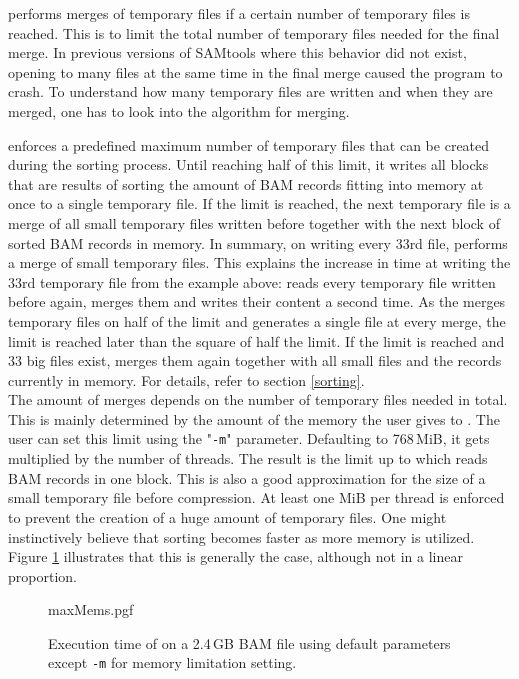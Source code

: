 \sort performs merges of temporary files if a certain number of temporary files is reached. This is to limit the total number of temporary files needed for the final merge. In previous versions of SAMtools where this behavior did not exist, opening to many files at the same time in the final merge caused the program to crash.
To understand how many temporary files are written and when they are merged, one has to look into the algorithm for merging. 

 \sort enforces a predefined maximum number of temporary files that can be created during the sorting process. Until reaching half of this limit, it writes all blocks that are results of sorting the amount of BAM records fitting into memory at once to a single temporary file. If the limit is reached, the next temporary file is a merge of all small temporary files written before together with the next block of sorted BAM records in memory. In summary, on writing every 33rd file, \sort performs a merge of small temporary files. This explains the increase in time at writing the 33rd temporary file from the example above: \sort reads every temporary file written before again, merges them and writes their content a second time. As the \sort merges temporary files on half of the limit and generates a single file at every merge, the limit is reached later than the square of half the limit. If the limit is reached and 33 big files exist, \sort merges them again together with all small files and the records currently in memory. For details, refer to section \ref{sorting}. \\
The amount of merges depends on the number of temporary files needed in total. This is mainly determined by the amount of the memory the user gives to \sort. The user can set this limit using the "\texttt{-m}" parameter. Defaulting to 768\,MiB, it gets multiplied by the number of threads. The result is the limit up to which \sort reads BAM records in one block. This is also a good approximation for the size of a small temporary file before compression. At least one MiB per thread is enforced to prevent the creation of a huge amount of temporary files. One might instinctively believe that sorting becomes faster as more memory is utilized. Figure \ref{fig:maxMems} illustrates that this is generally the case, although not in a linear proportion.
\begin{figure}
        {maxMems.pgf}
    \caption{Execution time of \sort on a 2.4\,GB BAM file using default parameters except \texttt{-m} for memory limitation setting. }
    \label{fig:maxMems}
\end{figure}
